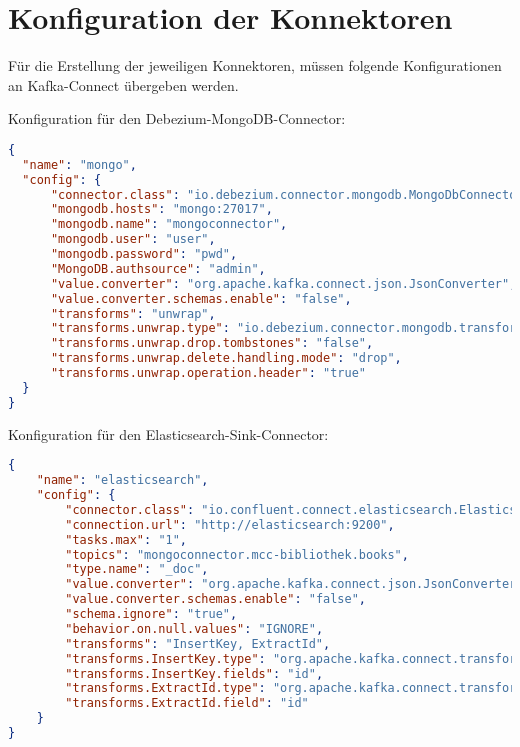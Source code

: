 \chapter{Konfiguration der Konnektoren}

Für die Erstellung der jeweiligen Konnektoren, müssen folgende Konfigurationen an Kafka-Connect übergeben werden.

Konfiguration für den Debezium-MongoDB-Connector:

\begin{lstlisting}[language=json,firstnumber=1]
{
  "name": "mongo",
  "config": {
      "connector.class": "io.debezium.connector.mongodb.MongoDbConnector",
      "mongodb.hosts": "mongo:27017",
      "mongodb.name": "mongoconnector",
      "mongodb.user": "user",
      "mongodb.password": "pwd",
      "MongoDB.authsource": "admin",
      "value.converter": "org.apache.kafka.connect.json.JsonConverter",
      "value.converter.schemas.enable": "false",
      "transforms": "unwrap",
      "transforms.unwrap.type": "io.debezium.connector.mongodb.transforms.ExtractNewDocumentState",
      "transforms.unwrap.drop.tombstones": "false",
      "transforms.unwrap.delete.handling.mode": "drop",
      "transforms.unwrap.operation.header": "true"
  }
}
\end{lstlisting}

Konfiguration für den Elasticsearch-Sink-Connector:

\begin{lstlisting}[language=json,firstnumber=1]
{
    "name": "elasticsearch",
    "config": {
        "connector.class": "io.confluent.connect.elasticsearch.ElasticsearchSinkConnector",
        "connection.url": "http://elasticsearch:9200",
        "tasks.max": "1",
        "topics": "mongoconnector.mcc-bibliothek.books",
        "type.name": "_doc",
        "value.converter": "org.apache.kafka.connect.json.JsonConverter",
        "value.converter.schemas.enable": "false",
        "schema.ignore": "true",
        "behavior.on.null.values": "IGNORE",
        "transforms": "InsertKey, ExtractId",
        "transforms.InsertKey.type": "org.apache.kafka.connect.transforms.ValueToKey",
        "transforms.InsertKey.fields": "id",
        "transforms.ExtractId.type": "org.apache.kafka.connect.transforms.ExtractField$Key",
        "transforms.ExtractId.field": "id"
    }
}
\end{lstlisting}